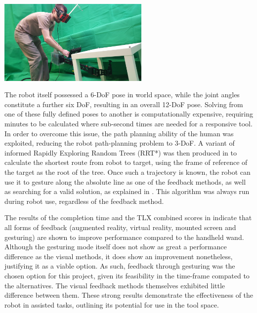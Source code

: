 \documentclass[11pt]{article}
\begin{document}
\begin{center}
\includegraphics[width=0.55\textwidth]{vrrobot.png}
\label{figure:vrrobot}
\end{center} 
 
The robot itself possessed a 6-DoF pose in world space, while the joint angles constitute a further six DoF, resulting in an overall 12-DoF pose. Solving from one of these fully defined poses to another is computationally expensive, requiring minutes to be calculated where sub-second times are needed for a responsive tool. In order to overcome this issue, the path planning ability of the human was exploited, reducing the robot path-planning problem to 3-DoF. A variant of informed Rapidly Exploring Random Trees (RRT*) \cite{Gammell2014} was then produced in \cite{GreggSmithFeedback} to calculate the shortest route from robot to target, using the frame of reference of the target as the root of the tree. Once such a trajectory is known, the robot can use it to gesture along the absolute line as one of the feedback methods, as well as searching for a valid solution, as explained in \cite{GreggSmithKinematics}. This algorithm was always run during robot use, regardless of the feedback method.

The results of the completion time and the TLX combined scores in \cite{GreggSmithFeedback} indicate that all forms of feedback (augmented reality, virtual reality, mounted screen and gesturing) are shown to improve performance compared to the handheld wand. Although the gesturing mode itself does not show as great a performance difference as the visual methods, it does show an improvement nonetheless, justifying it as a viable option. As such, feedback through gesturing was the chosen option for this project, given its feasibility in the time-frame compated to the alternatives. The visual feedback methods themselves exhibited little difference between them. These strong results demonstrate the effectiveness of the robot in assisted tasks, outlining its potential for use in the tool space.
	
\end{document}
